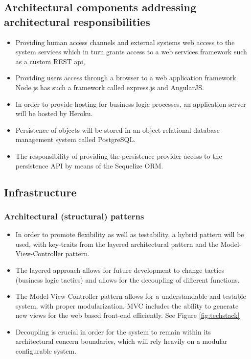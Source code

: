 \documentclass{article}
\begin{document}
	\subsection{Architectural components addressing architectural responsibilities}
		\begin{itemize}
		\item Providing human access channels and external systems web access to the system services which in turn grants access to a web services framework such as a custom REST api,
		\item Providing users access through a browser to a web application framework. Node.js has such a framework called express.js and AngularJS.
		\item In order to provide hosting for business logic processes, an application server will be hosted by Heroku.
		\item Persistence of objects will be stored in an object-relational database management system called PostgreSQL.
		\item The responsibility of providing the persistence provider access to the persistence API by means of the Sequelize ORM.
		\end{itemize}

\pagebreak
	\subsection{Infrastructure}
	\subsubsection{Architectural (structural) patterns}
	\begin{itemize}
	
	
	\item In order to promote flexibility as well as testability, a hybrid pattern will be used, with key-traits from the  layered architectural pattern and the Model-View-Controller pattern.
	\item The layered approach allows for future development to change tactics (business logic tactics) and allows for the decoupling of different functions. 
	\item The Model-View-Controller pattern allows for a understandable and testable system, with proper modularization.
	MVC includes the ability to generate new views for the web based front-end efficiently. See Figure \ref{fig:techstack}
	\item Decoupling is crucial in order for the system to remain within its architectural concern boundaries, which will rely heavily on a modular configurable system.  
	\end{itemize}
\end{document}
